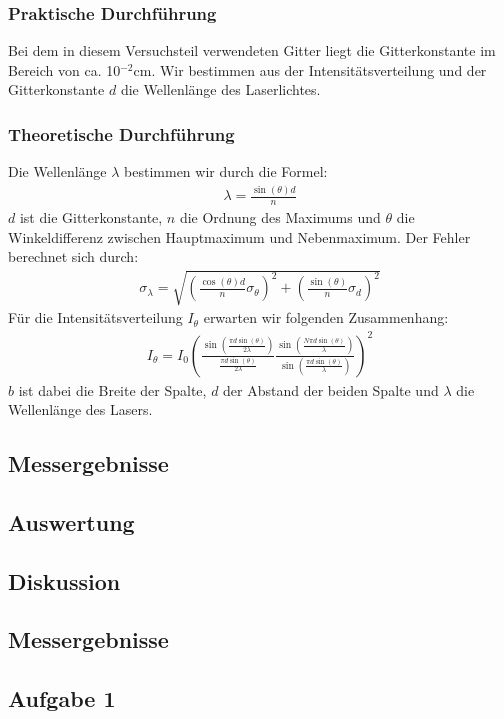 \documentclass[12pt]{scrartcl}
\begin{document}
\subsubsection{Praktische Durchführung}
Bei dem in diesem Versuchsteil verwendeten Gitter liegt die Gitterkonstante im Bereich von ca. 10$^{-2}$cm. Wir bestimmen aus der Intensitätsverteilung und der Gitterkonstante $d$ die Wellenlänge des Laserlichtes.
\subsubsection{Theoretische Durchführung}
Die Wellenlänge $\lambda$ bestimmen wir durch die Formel:
\begin{align}
\lambda = \frac{\sin(\theta) d}{n}
\end{align}
$d$ ist die Gitterkonstante, $n$ die Ordnung des Maximums und $\theta$ die Winkeldifferenz zwischen Hauptmaximum und Nebenmaximum.
Der Fehler berechnet sich durch:
\begin{align}
\sigma_\lambda = \sqrt{
\left(\frac{\cos(\theta) d}{n}\sigma_\theta\right)^2+
\left(\frac{\sin(\theta)}{n}\sigma_d\right)^2}
\end{align}
Für die Intensitätsverteilung $I_\theta$ erwarten wir folgenden Zusammenhang:
\begin{align}
I_\theta = I_0\left(\frac{\sin\left(\frac{\pi d \sin(\theta)}{2\lambda}\right)}{\frac{\pi d \sin(\theta)}{2\lambda}}
\frac{\sin\left(\frac{N \pi d \sin(\theta)}{\lambda}\right)}{\sin\left(\frac{\pi d \sin(\theta)}{\lambda}\right)}\right)^2
\end{align}
$b$ ist dabei die Breite der Spalte, $d$ der Abstand der beiden Spalte und $\lambda$ die Wellenlänge des Lasers.

\subsection{Messergebnisse}
\subsection{Auswertung}
\subsection{Diskussion}
\subsection{Messergebnisse}

\subsection{Aufgabe 1}
\end{document}
